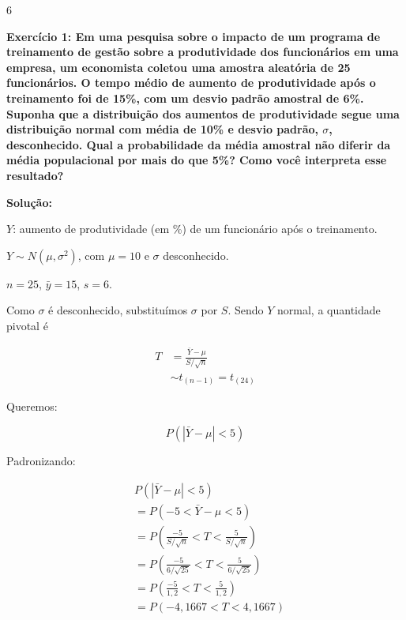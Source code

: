 \documentclass[8pt, a4paper, landscape]{extarticle}
\begin{document}
\tiny 

\begin{multicols}{6}


\textbf{Exercício 1: Em uma pesquisa sobre o impacto de um programa de treinamento de gestão sobre a produtividade dos funcionários em uma empresa, um economista coletou uma amostra aleatória de 25 funcionários. O tempo médio de aumento de produtividade após o treinamento foi de 15\%, com um desvio padrão amostral de 6\%. Suponha que a distribuição dos aumentos de produtividade segue uma distribuição normal com média de 10\% e desvio padrão, $\sigma$, desconhecido. Qual a probabilidade da média amostral não diferir da média populacional por mais do que 5\%? Como você interpreta esse resultado?}

\vspace{0.3cm}

\textbf{Solução:}

$Y$: aumento de produtividade (em \%) de um funcionário após o treinamento.

$Y \sim N(\mu, \sigma^2)$, com $\mu = 10$ e $\sigma$ desconhecido.

$n = 25$, \quad $\bar{y} = 15$, \quad $s = 6$.

Como $\sigma$ é desconhecido, substituímos $\sigma$ por $S$. Sendo $Y$ normal, a quantidade pivotal é

\begin{equation*}
\begin{split}
T &= \frac{\bar{Y} - \mu}{S/\sqrt{n}} \\
  &\sim t_{(n-1)} = t_{(24)}
\end{split}
\end{equation*}

Queremos:

\begin{equation*}
P\left(|\bar{Y} - \mu| < 5\right)
\end{equation*}

Padronizando:

\begin{equation*}
\begin{split}
&P\left(|\bar{Y} - \mu| < 5\right) \\
&= P\left(-5 < \bar{Y} - \mu < 5\right) \\
&= P\left(\frac{-5}{S/\sqrt{n}} < T < \frac{5}{S/\sqrt{n}}\right) \\
&= P\left(\frac{-5}{6/\sqrt{25}} < T < \frac{5}{6/\sqrt{25}}\right) \\
&= P\left(\frac{-5}{1,2} < T < \frac{5}{1,2}\right) \\
&= P\left(-4,1667 < T < 4,1667\right)
\end{split}
\end{equation*}


\end{multicols}
\end{document}
